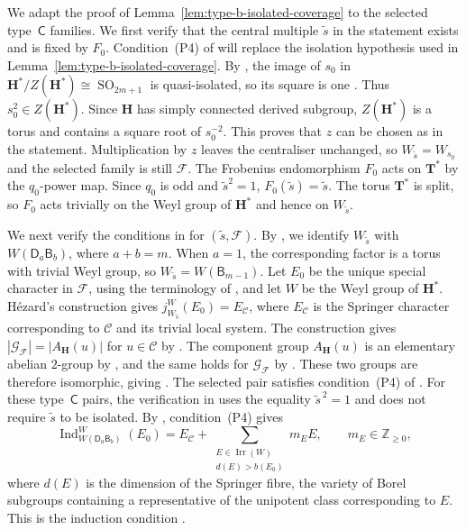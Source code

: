 \documentclass[10pt]{amsart}
\theoremstyle{definition}
\renewcommand{\geq}{\geqslant}
\let\oldendproof\endproof
\renewenvironment{proof}[1][\proofname]{%
  \oldproof[\bfseries #1]%
}{\oldendproof}
\DeclareMathOperator{\Irr}{Irr}
\numberwithin{equation}{section}
\numberwithin{table}{section}
\begin{document}
\begin{proof}[Proof of Lemma~\ref{lem:symplectic-gggr-selection}]
We adapt the proof of Lemma~\ref{lem:type-b-isolated-coverage} to the selected
type~$\mathsf C$ families. We first verify that the central multiple
$\widetilde s$ in the statement exists and is fixed by $F_0$.
Condition~\textup{(P4)} of \cite[Theorem~2.11]{Taylor2014Maximal} will replace
the isolation hypothesis used in Lemma~\ref{lem:type-b-isolated-coverage}.
By \cite[6.19]{Taylor2014Maximal}, the image of $s_0$ in
$\mathbf H^*/Z(\mathbf H^*)\cong\operatorname{SO}_{2m+1}$ is
quasi-isolated, so its square is one
\cite[Proposition~4.11(a)]{Bonnafe2005}. Thus $s_0^2\in Z(\mathbf H^*)$.
Since $\mathbf H$ has simply connected derived subgroup,
$Z(\mathbf H^*)$ is a torus \cite[Lemma~1.5.22]{GeckMalle2020}
and contains a square root of $s_0^{-2}$. This proves that $z$ can
be chosen as in the statement.
Multiplication by $z$ leaves the centraliser unchanged, so
$W_{\widetilde s}=W_{s_0}$ and the selected family is still $\mathcal F$.
The Frobenius endomorphism $F_0$ acts on $\mathbf T^*$ by the
$q_0$-power map. Since $q_0$ is odd and $\widetilde s^2=1$,
$F_0(\widetilde s)=\widetilde s$.
The torus $\mathbf T^*$ is split, so $F_0$ acts trivially on the
Weyl group of $\mathbf H^*$ and hence on $W_{\widetilde s}$.

We next verify the conditions in \cite[(4.4)(a)--(b)]{Geck1999GGGR}
for $(\widetilde s,\mathcal F)$.
By \cite[10.3]{Taylor2014Maximal}, we identify
$W_{\widetilde s}$ with $W(\mathsf D_a\mathsf B_b)$, where $a+b=m$.
When $a=1$, the corresponding factor is a torus with trivial Weyl group,
so $W_{\widetilde s}=W(\mathsf B_{m-1})$.
Let $E_0$ be the unique special character in $\mathcal F$,
using the terminology of \cite[p.~476]{Taylor2014Maximal}, and let
$W$ be the Weyl group of $\mathbf H^*$.
H\'ezard's construction \cite[Proposition~10.2]{Taylor2014Maximal} gives
$j_{W_{\widetilde s}}^W(E_0)=E_{\mathcal C}$, where
$E_{\mathcal C}$ is the Springer character corresponding to
$\mathcal C$ and its trivial local system.
The construction gives
$|\mathcal G_{\mathcal F}|=|A_{\mathbf H}(u)|$ for $u\in\mathcal C$
by \cite[7.1 and Proposition~10.2]{Taylor2014Maximal}.
The component group $A_{\mathbf H}(u)$ is an elementary abelian
$2$-group by \cite[proof of Proposition~2.4]{Taylor2013}, and the
same holds for $\mathcal G_{\mathcal F}$ by
\cite[Remark~4.2.17]{GeckMalle2020}.
These two groups are therefore isomorphic, giving
\cite[(4.4)(a)]{Geck1999GGGR}.
The selected pair satisfies condition~\textup{(P4)} of
\cite[Theorem~2.11]{Taylor2014Maximal}. For these type~$\mathsf C$
pairs, the verification in \cite[7.4]{Taylor2014Maximal} uses the equality
$\widetilde s^{\,2}=1$ and does not require $\widetilde s$ to be isolated.
By \cite[Definition~2.7]{Taylor2014Maximal}, condition~\textup{(P4)} gives
\[
 \operatorname{Ind}_{W(\mathsf D_a\mathsf B_b)}^W(E_0)
 =E_{\mathcal C}
  +\sum_{\substack{E\in\Irr(W)\\d(E)>b(E_0)}}m_EE,
 \qquad m_E\in\mathbb Z_{\geq0},
\]
where $d(E)$ is the dimension of the Springer fibre, the variety of
Borel subgroups containing a representative of the unipotent class
corresponding to $E$. This is the induction condition
\cite[(4.4)(b)]{Geck1999GGGR}.


\end{proof}
\end{document}
